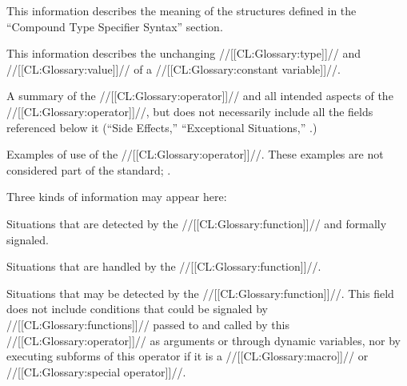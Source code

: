 This information describes the meaning of the structures defined in the ``Compound Type Specifier Syntax'' section.

\endsubsubsubsection%

\endsubsubsection%


This information describes the unchanging //[[CL:Glossary:type]]// and //[[CL:Glossary:value]]// of  a //[[CL:Glossary:constant variable]]//.

\endsubsubsection%


A summary of the //[[CL:Glossary:operator]]// and all intended aspects of the //[[CL:Glossary:operator]]//,  but does not necessarily include all the fields referenced below it  (``Side Effects,'' ``Exceptional Situations,'' \etc.)

\endsubsubsection%


Examples of use of the //[[CL:Glossary:operator]]//. These examples are not considered part of the standard; \seesection\RemovableText.

\endsubsubsection%


  Three kinds of information may appear here: \beginlist \item{\bull} Situations that are detected by the //[[CL:Glossary:function]]// and formally signaled. \item{\bull} Situations that are handled by the //[[CL:Glossary:function]]//. \item{\bull} Situations that may be detected by the //[[CL:Glossary:function]]//. \endlist This field does not include conditions that could be signaled by //[[CL:Glossary:functions]]// passed to and called by this //[[CL:Glossary:operator]]// as arguments or through dynamic variables, nor by executing subforms of this operator if it is a //[[CL:Glossary:macro]]// or //[[CL:Glossary:special operator]]//.

